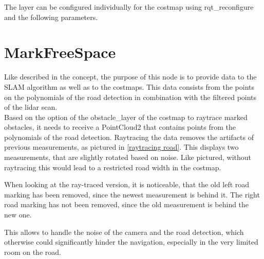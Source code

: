 The layer can be configured individually for the costmap using rqt\_reconfigure and the following parameters.




\begin{table}[H]
\centering
{}
\label{dynlayerparams}
\caption{dynamic\_cost\_layer parameters}
\end{table}




\section{MarkFreeSpace}

Like described in the concept, the purpose of this node is to provide data to the SLAM algorithm as well as to the costmaps. This data consists from the points on the polynomials of the road detection in combination with the filtered points of the lidar scan.\\
Based on the option of the obstacle\_layer of the costmap to raytrace marked obstacles, it needs to receive a PointCloud2 that contains points from the polynomials of the road detection. Raytracing the data removes the artifacts of previous measurements, as pictured in \ref{raytracing road}. 
This displays two measurements, that are slightly rotated based on noise. Like pictured, without raytracing this would lead to a restricted road width in the costmap.

When looking at the ray-traced version, it is noticeable, that the old left road marking has been removed, since the newest measurement is behind it. The right road marking has not been removed, since the old measurement is behind the new one.

This allows to handle the noise of the camera and the road detection, which otherwise could significantly hinder the navigation, especially in the very limited room on the road.

